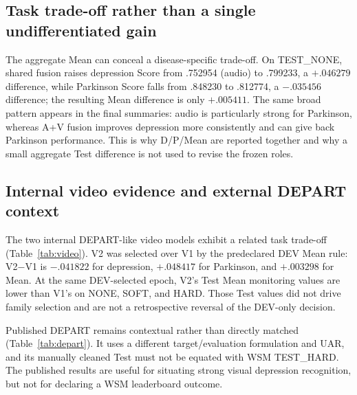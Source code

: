 \subsection{Task trade-off rather than a single undifferentiated gain}

The aggregate Mean can conceal a disease-specific trade-off. On TEST\_NONE, shared fusion raises depression Score from .752954 (audio) to .799233, a $+.046279$ difference, while Parkinson Score falls from .848230 to .812774, a $-.035456$ difference; the resulting Mean difference is only $+.005411$. The same broad pattern appears in the final summaries: audio is particularly strong for Parkinson, whereas A+V fusion improves depression more consistently and can give back Parkinson performance. This is why D/P/Mean are reported together and why a small aggregate Test difference is not used to revise the frozen roles.

\subsection{Internal video evidence and external DEPART context}

The two internal DEPART-like video models exhibit a related task trade-off (Table~\ref{tab:video}). V2 was selected over V1 by the predeclared DEV Mean rule: V2$-$V1 is $-.041822$ for depression, $+.048417$ for Parkinson, and $+.003298$ for Mean. At the same DEV-selected epoch, V2's Test Mean monitoring values are lower than V1's on NONE, SOFT, and HARD. Those Test values did not drive family selection and are not a retrospective reversal of the DEV-only decision.

\begin{table}[t]
\centering\small
\caption{Internal DEPART-like video baselines. V2 was selected by DEV Mean before its monitoring Test values were considered.}
\label{tab:video}
\end{table}

Published DEPART remains contextual rather than directly matched (Table~\ref{tab:depart}). It uses a different target/evaluation formulation and UAR, and its manually cleaned Test must not be equated with WSM TEST\_HARD. The published results are useful for situating strong visual depression recognition, but not for declaring a WSM leaderboard outcome.

